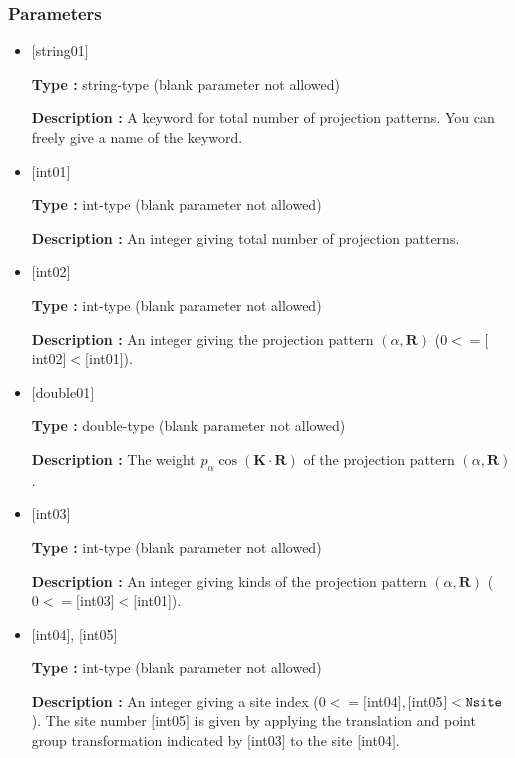 \subsubsection{Parameters}
 \begin{itemize}

   \item  $[$string01$]$
   
    {\bf Type :} string-type (blank parameter not allowed)

   {\bf Description :} A keyword for total number of projection patterns. You can freely give a name of the keyword.

   \item  $[$int01$]$
   
    {\bf Type :} int-type (blank parameter not allowed)

   {\bf Description :} An integer giving total number of projection patterns. 

  \item  $[$int02$]$
   
 {\bf Type :} int-type (blank parameter not allowed)

{\bf Description :} An integer giving the projection pattern $(\alpha, {\bm R})$ ($0<= [$int02$]<[$int01]). 
 
  \item  $[$double01$]$
   
 {\bf Type :} double-type (blank parameter not allowed)

{\bf Description :} The weight $p_{\alpha}\cos ({\bm K}\cdot {\bm R})$ of the projection pattern $(\alpha, {\bm R})$.
 
 \item  $[$int03$]$
   
   {\bf Type :} int-type (blank parameter not allowed)

  {\bf Description :} An integer giving kinds of the projection pattern $(\alpha, {\bm R})$  ($0<= [$int03$]<[$int01]). 

 \item  $[$int04$]$, $[$int05$]$
   
   {\bf Type :} int-type (blank parameter not allowed)

  {\bf Description :} An integer giving a site index ($0<= [$int04$], [$int05$]<\verb|Nsite|$). 
  The site number $[$int05$]$ is given by applying the translation and point group transformation indicated by $[$int03$]$ to the site $[$int04$]$.

\end{itemize}

